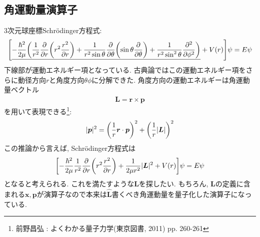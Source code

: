 \documentclass[10.5pt,a4paper]{jreport}
\newcommand{\ul}[1]{\underline{#1}}
\newcommand{\bx}{\bm{x}}
\begin{document}
\subsection{角運動量演算子}
3次元球座標Schr\"odinger方程式:
\begin{eqnarray}
  \qty[\ul{-\frac{\hbar^2}{2\mu}\qty(\frac{1}{r^2}\frac{\partial}{\partial r}\qty(r^2\frac{r^2}{\partial r}) + \frac{1}{r^2\sin{\theta}}\frac{\partial}{\partial \theta}\qty(\sin{\theta}\frac{\partial}{\partial \theta}) + \frac{1}{r^2\sin^2{\theta}}\frac{\partial^2}{\partial \phi^2})} + V(r)]\psi = E\psi
\end{eqnarray}
下線部が運動エネルギー項となっている. 古典論ではこの運動エネルギー項をさらに動径方向$r$と角度方向$\theta\phi$に分解できた. 角度方向の運動エネルギーは角運動量ベクトル
\begin{eqnarray}
  \bm{L} = \bm{r}\times\bm{p}
\end{eqnarray}
を用いて表現できる\footnote{前野昌弘 : よくわかる量子力学(東京図書, 2011) pp. 260-261}:
\begin{eqnarray}
  |\bm{p}|^2 = \qty(\frac{1}{r}\bm{r}\cdot\bm{p})^2 + \qty(\frac{1}{r}|\bm{L}|)^2
\end{eqnarray}
この推論から言えば, Schr\"odinger方程式は
\begin{eqnarray}
  \qty[-\frac{\hbar^2}{2\mu}\frac{1}{r^2}\frac{\partial}{\partial r}\qty(r^2\frac{r^2}{\partial r}) + \frac{1}{2\mu r^2}|\bm{L}|^2  + V(r)]\psi = E\psi
\end{eqnarray}
となると考えられる. これを満たすような$\bm{L}$を探したい. もちろん, $\bm{L}$の定義に含まれる$\bx, \bm{p}$が演算子なので本来は$\hat{\bm{L}}$書くべき角運動量を量子化した演算子になっている.
\end{document}
